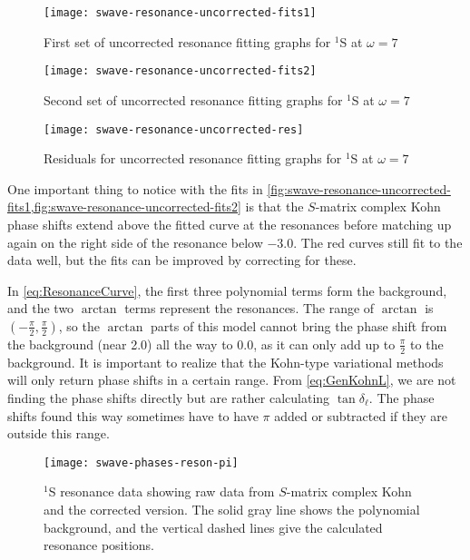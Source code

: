 \documentclass[Dissertation.tex]{subfiles}
\begin{document}
\begin{figure}
	\centering
	\texttt{[image: swave-resonance-uncorrected-fits1]}
	\caption{First set of uncorrected resonance fitting graphs for $^1$S at $\omega = 7$}
	\label{fig:swave-resonance-uncorrected-fits1}
\end{figure}

\begin{figure}
	\centering
	\texttt{[image: swave-resonance-uncorrected-fits2]}
	\caption{Second set of uncorrected resonance fitting graphs for $^1$S at $\omega = 7$}
	\label{fig:swave-resonance-uncorrected-fits2}
\end{figure}

\begin{figure}
	\centering
	\texttt{[image: swave-resonance-uncorrected-res]}
	\caption{Residuals for uncorrected resonance fitting graphs for $^1$S at $\omega = 7$}
	\label{fig:swave-resonance-uncorrected-res}
\end{figure}

One important thing to notice with the fits in
\cref{fig:swave-resonance-uncorrected-fits1,fig:swave-resonance-uncorrected-fits2} is that the
$S$-matrix complex Kohn phase shifts extend above the fitted curve at the resonances before 
matching up again on the right side of the resonance below $-3.0$. The red 
curves still fit to the data well, but the fits can be improved by correcting 
for these. 

In \cref{eq:ResonanceCurve}, the first three polynomial terms form the 
background, and the two $\arctan$ terms represent the resonances. The range 
of $\arctan$ is $(-\frac{\pi}{2},\frac{\pi}{2})$, so the $\arctan$ parts of 
this model cannot bring the phase shift from the background (near 2.0) all 
the way to 0.0, as it can only add up to $\frac{\pi}{2}$ to the background. 
It is important to realize that the Kohn-type variational methods will only return phase 
shifts in a certain range. From \cref{eq:GenKohnL}, we are not finding the 
phase shifts directly but are rather calculating $\tan \delta_\ell$. The 
phase shifts found this way sometimes have to have $\pi$ added or subtracted 
if they are outside this range.

\begin{figure}
	\centering
	\texttt{[image: swave-phases-reson-pi]}
	\caption[$^1$S resonance data showing correction]{$^1$S resonance data showing raw data from $S$-matrix complex Kohn and the corrected version. The solid gray line shows the polynomial background, and the vertical dashed lines give the calculated resonance positions.}
	\label{fig:swave-phases-reson-pi}
\end{figure}
\end{document}
